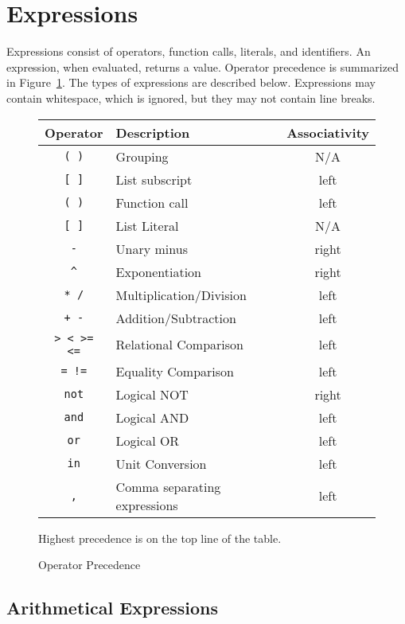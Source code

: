 \section{Expressions}
\label{expressions}

Expressions consist of operators, function calls, literals, and
identifiers.  An expression, when evaluated, returns a value.
Operator precedence is summarized in Figure~\ref{precedence}.  The
types of expressions are described below.  Expressions may contain
whitespace, which is ignored, but they may not contain line breaks.

\begin{figure}
\centering%
\begin{tabular}{|c|l|c|} \hline
\bf Operator   & \bf Description     & \bf Associativity \\ \hline
\verb|( )| & Grouping        & N/A  \\ \hline
\id{}\verb|[ ]| & List subscript & left  \\ \hline
\id{}\verb|( )| & Function call & left \\ \hline
\verb|[ ]| & List Literal   & N/A \\ \hline
\verb|-|   & Unary minus     & right \\ \hline
\verb|^|   & Exponentiation  & right \\ \hline
\verb|* /| & Multiplication/Division & left \\ \hline
\verb|+ -| & Addition/Subtraction & left \\ \hline
\verb|> < >= <=| & Relational Comparison & left \\ \hline
\verb|= !=| & Equality Comparison & left \\ \hline
\verb|not| & Logical NOT & right \\ \hline
\verb|and| & Logical AND & left \\ \hline
\verb|or|  & Logical OR  & left \\ \hline
\verb|in|  & Unit Conversion & left \\ \hline
\verb|,|   & Comma separating expressions & left \\ \hline
\end{tabular}

Highest precedence is on the top line of the table.
\caption{Operator Precedence}
\label{precedence}
\end{figure}


\subsection{Arithmetical Expressions}

